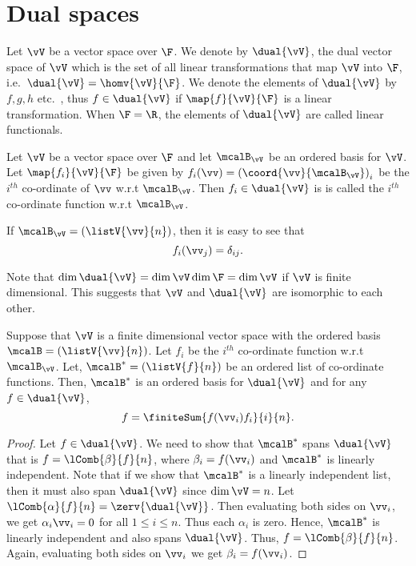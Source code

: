 \section{Dual spaces}
\begin{Definition}[name=Dual vector space]
    Let $\vV$ be a vector space over $\F$. We denote by $\dual{\vV}$, the dual vector space of $\vV$ which is
    the set of all linear transformations that map $\vV$ into $\F$, i.e.~$\dual{\vV} = \homv{\vV}{\F}$. We
    denote the elements of $\dual{\vV}$ by $f,g,h$ etc.~, thus $f \in \dual{\vV}$ if $\map{f}{\vV}{\F}$ is a
    linear transformation. When $\F = \R$, the elements of $\dual{\vV}$ are called linear functionals.
\end{Definition}
\begin{Example}
    Let $\vV$ be a vector space over $\F$ and let $\mcalB_{\vV}$ be an ordered basis for $\vV$. Let
    $\map{f_i}{\vV}{\F}$ be given by $f_i(\vv) = {\left(\coord{\vv}{\mcalB_{\vV}}\right)}_{i}$ be the 
    $i^{th}$ co-ordinate of $\vv$ w.r.t $\mcalB_{\vV}$. Then $f_i \in \dual{\vV}$ is is called the $i^{th}$
    co-ordinate function w.r.t $\mcalB_{\vV}$.
\end{Example}
\begin{Remark}
    If $\mcalB_{\vV} = \left(\listV{\vv}{n}\right)$, then it is easy to see that
    \[f_i(\vv_{j}) = \delta_{ij}.\]
\end{Remark}
\begin{Remark}
    Note that $\dim{\dual{\vV}} = \dim{\vV}\dim{\F} = \dim{\vV}$ if $\vV$ is finite dimensional. 
    This suggests that $\vV$ and $\dual{\vV}$ are isomorphic to each other.
\end{Remark}
\begin{Theorem}
    Suppose that $\vV$ is a finite dimensional vector space with the ordered basis $\mcalB =
    \left(\listV{\vv}{n}\right)$. Let $f_i$ be the $i^{th}$ co-ordinate function w.r.t $\mcalB_{\vV}$. Let,
    $\mcalB^{\ast} = \left(\listV{f}{n}\right)$ be an ordered list of co-ordinate functions. Then,
    $\mcalB^{\ast}$ is an ordered basis for $\dual{\vV}$ and for any $f\in \dual{\vV}$,
    \[f = \finiteSum{f(\vv_{i})f_i}{i}{n}.\]
\end{Theorem}
\begin{proof}
    Let $f \in \dual{\vV}$. We need to show that $\mcalB^{\ast}$ spans $\dual{\vV}$
    that is $f = \lComb{\beta}{f}{n}$, where $\beta_{i} = f(\vv_i)$ and $\mcalB^{\ast}$ is linearly
    independent. Note that if we show that $\mcalB^{\ast}$ is a linearly independent list, then it must also
    span $\dual{\vV}$ since $\dim{\vV} = n$.
    Let $\lComb{\alpha}{f}{n} = \zerv{\dual{\vV}}$. Then evaluating both sides on $\vv_{i}$, we get
    $\alpha_i{\vv_i} = 0$ for all $1 \leq i \leq n$. Thus each $\alpha_{i}$ is zero. Hence, $\mcalB^{\ast}$ is
    linearly independent and also spans $\dual{\vV}$. Thus,
    $f = \lComb{\beta}{f}{n}$. Again, evaluating both sides on $\vv_{i}$ we get $\beta_{i} = f(\vv_{i})$.
\end{proof}
